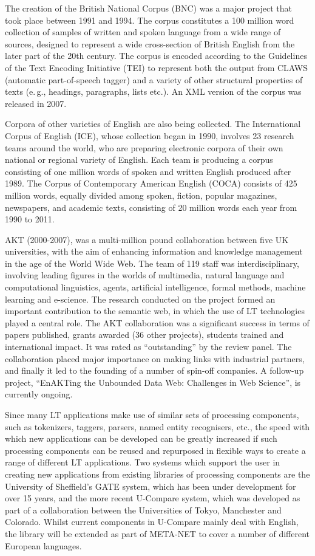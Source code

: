 \documentclass[]{../../metanetpaper}
\begin{document}
\begin{multicols}{2}
The creation of the British National Corpus (BNC) was a major project that took place between 1991 and 1994. The corpus constitutes a 100 million word collection of samples of written and spoken language from a wide range of sources, designed to represent a wide cross-section of British English from the later part of the 20th century. The corpus is encoded according to the Guidelines of the Text Encoding Initiative (TEI) to represent both the output from CLAWS (automatic part-of-speech tagger) and a variety of other structural properties of texts (e.\,g., headings, paragraphs, lists etc.). An XML version of the corpus was released in 2007.

Corpora of other varieties of English are also being collected. The International Corpus of English (ICE), whose collection began in 1990, involves 23 research teams around the world, who are preparing electronic corpora of their own national or regional variety of English. Each team is producing a corpus consisting of one million words of spoken and written English produced after 1989. The Corpus of Contemporary American English (COCA) consists of 425 million words, equally divided among spoken, fiction, popular magazines, newspapers, and academic texts, consisting of 20 million words each year from 1990 to 2011.

AKT (2000-2007), was a multi-million pound collaboration between five UK universities, with the aim of enhancing information and knowledge management in the age of the World Wide Web. The team of 119 staff was interdisciplinary, involving leading figures in the worlds of multimedia, natural language and computational linguistics, agents, artificial intelligence, formal methods, machine learning and e-science. The research conducted on the project formed an important contribution to the semantic web, in which the use of LT technologies played a central role. The AKT collaboration was a significant success in terms of papers published, grants awarded (36 other projects), students trained and international impact. It was rated as ``outstanding'' by the review panel.  The collaboration placed major importance on making links with industrial partners, and finally it led to the founding of a number of spin-off companies. A follow-up project, ``EnAKTing the Unbounded Data Web: Challenges in Web Science'', is currently ongoing.

Since many LT applications make use of similar sets of processing components, such as tokenizers, taggers, parsers, named entity recognisers, etc., the speed with which new applications can be developed can be greatly increased if such processing components can be reused and repurposed in flexible ways to create a range of different LT applications. Two systems which support the user in creating new applications from existing libraries of processing components are the University of Sheffield's GATE system, which has been under development for over 15 years, and the more recent U-Compare system, which was developed as part of a collaboration between the Universities of Tokyo, Manchester and Colorado. Whilst current components in U-Compare mainly deal with English, the library will be extended as part of META-NET to cover a number of different European languages. 


\end{multicols}
\end{document}
